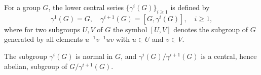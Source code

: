 For a group $G$, the lower central series $\{\gamma^i(G)\}_{i \geq 1}$ is defined by
$$\gamma^1(G) = G, \quad \gamma^{i+1}(G) = [G, \gamma^i(G)], \quad i \geq 1,$$
where for two subgroups $U, V$ of $G$ the symbol $[U, V]$ denotes the subgroup of $G$ generated by all elements $u^{-1}v^{-1}uv$ with $u \in U$ and $v \in V$.

The subgroup $\gamma^i(G)$ is normal in $G$, and $\gamma^i(G)/\gamma^{i+1}(G)$ is a central, hence abelian, subgroup of $G/\gamma^{i+1}(G)$.
